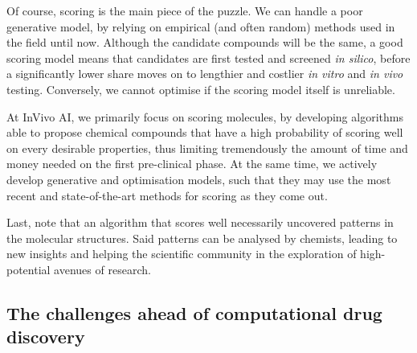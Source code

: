 \documentclass[11pt]{article}
\numberwithin{equation}{subsection}
\begin{document}
Of course, scoring is the main piece of the puzzle. We can handle a poor generative model, by relying on empirical (and often random) methods used in the field until now. Although the candidate compounds will be the same, a good scoring model means that candidates are first tested and screened \textit{in silico}, before a significantly lower share moves on to lengthier and costlier \textit{in vitro} and \textit{in vivo} testing. Conversely, we cannot optimise if the scoring model itself is unreliable.

At InVivo AI, we primarily focus on scoring molecules, by developing algorithms able to propose chemical compounds that have a high probability of scoring well on every desirable properties, thus limiting tremendously the amount of time and money needed on the first pre-clinical phase. At the same time, we actively develop generative and optimisation models, such that they may use the most recent and state-of-the-art methods for scoring as they come out.

Last, note that an algorithm that scores well necessarily uncovered patterns in the molecular structures. Said patterns can be analysed by chemists, leading to new insights and helping the scientific community in the exploration of high-potential avenues of research.


\subsection{The challenges ahead of computational drug discovery}
\end{document}
